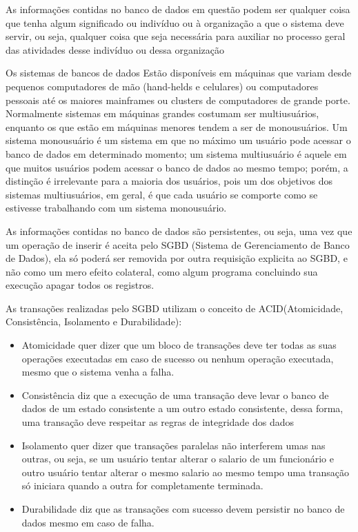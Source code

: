As informações contidas no banco de dados em questão podem ser qualquer coisa que tenha algum significado ou indivíduo ou à organização a que o sistema deve servir, ou seja, qualquer coisa que seja necessária para auxiliar no processo geral das atividades desse indivíduo ou dessa organização

Os sistemas de bancos de dados Estão disponíveis em máquinas que variam desde pequenos computadores de mão (hand-helds e celulares) ou computadores pessoais até os maiores mainframes ou clusters de computadores de grande porte. Normalmente sistemas em máquinas grandes costumam ser multiusuários, enquanto os que estão em máquinas menores tendem a ser de monousuários. Um sistema monousuário é um sistema em que no máximo um usuário pode acessar o banco de dados em determinado momento; um sistema multiusuário é aquele em que muitos usuários podem acessar o banco de dados ao mesmo tempo; porém, a distinção é irrelevante para a maioria dos usuários, pois um dos objetivos dos sistemas multiusuários, em geral, é que cada usuário se comporte como se estivesse trabalhando com um sistema monousuário.


As informações contidas no banco de dados são persistentes, ou seja, uma vez que um operação de inserir é aceita pelo SGBD (Sistema de Gerenciamento de Banco de Dados), ela só poderá ser removida por outra requisição explicita ao SGBD, e não como um mero efeito colateral, como algum programa concluindo sua execução apagar todos os registros.


As transações realizadas pelo SGBD utilizam o conceito de ACID(Atomicidade, Consistência, Isolamento e Durabilidade):

\begin{itemize}
		\item Atomicidade quer dizer que um bloco de transações deve ter todas as suas operações executadas em caso de sucesso ou nenhum operação executada, mesmo que o sistema venha a falha.
		\item Consistência diz que a execução de uma transação deve levar o banco de dados de um estado consistente a um outro estado consistente, dessa forma, uma transação deve respeitar as regras de integridade dos dados
		\item Isolamento quer dizer que transações paralelas não interferem umas nas outras, ou seja, se um usuário tentar alterar o salario de um funcionário e outro usuário tentar alterar o mesmo salario ao mesmo tempo uma transação só iniciara quando a outra for completamente terminada.
		\item Durabilidade diz que as transações com sucesso devem persistir no banco de dados mesmo em caso de falha.
\end{itemize}



